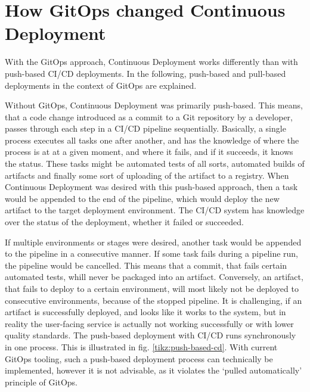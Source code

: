 \section{How GitOps changed Continuous Deployment}
\label{theoretical-background:gitops-cd}

With the GitOps approach,
Continuous Deployment works differently than with push-based CI/CD deployments.
In the following,
push-based and pull-based deployments in the context of GitOps are explained.


Without GitOps, Continuous Deployment was primarily push-based.
This means, that a code change introduced as a commit to a Git repository by a developer,
passes through each step in a CI/CD pipeline sequentially.
Basically, a single process executes all tasks one after another,
and has the knowledge of where the process is at at a given moment,
and where it fails, and if it succeeds, it knows the status.
These tasks might be automated tests of all sorts,
automated builds of artifacts and finally some sort of uploading of the artifact to a registry.
When Continuous Deployment was desired with this push-based approach,
then a task would be appended to the end of the pipeline,
which would deploy the new artifact to the target deployment environment.
The CI/CD system has knowledge over the status of the deployment, whether it failed or succeeded.

If multiple environments or stages were desired,
another task would be appended to the pipeline
in a consecutive manner.
If some task fails during a pipeline run,
the pipeline would be cancelled.
This means that a commit, that fails certain automated tests,
whill never be packaged into an artifact.
Conversely, an artifact, that fails to deploy to a certain environment,
will most likely not be deployed to consecutive environments, because of the stopped pipeline.
It is challenging, if an artifact is successfully deployed,
and looks like it works to the system,
but in reality the user-facing service is actually not working successfully or with lower quality standards.
The push-based deployment with CI/CD runs synchronously in one process.
This is illustrated in fig. \ref{tikz:push-based-cd}.
With current GitOps tooling,
such a push-based deployment process can technically be implemented,
however it is not advisable, as it violates the \enquote*{pulled automatically} principle of GitOps.


